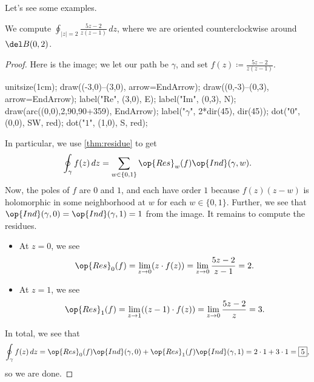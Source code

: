\documentclass[../notes.tex]{subfiles}
\begin{document}
Let's see some examples.
\begin{exe}
	We compute $\oint_{|z|=2}\frac{5z-2}{z(z-1)}\,dz$, where we are oriented counterclockwise around $\del B(0,2)$.
\end{exe}
\begin{proof}
	Here is the image; we let our path be $\gamma$, and set $f(z)\coloneqq \frac{5z-2}{z(z-1)}$.
	\begin{center}
		\begin{asy}
			unitsize(1cm);
			draw((-3,0)--(3,0), arrow=EndArrow);
			draw((0,-3)--(0,3), arrow=EndArrow);
			label("$\textrm{Re}$", (3,0), E);
			label("$\textrm{Im}$", (0,3), N);
			draw(arc((0,0),2,90,90+359), EndArrow);
			label("$\gamma$", 2*dir(45), dir(45));
			dot("$0$", (0,0), SW, red);
			dot("$1$", (1,0), S, red);
		\end{asy}
	\end{center}
	In particular, we use \autoref{thm:residue} to get
	\[\oint_{\gamma}f(z)\,dz=\sum_{w\in\{0,1\}}\op{Res}_w(f)\op{Ind}(\gamma,w).\]
	Now, the poles of $f$ are $0$ and $1$, and each have order $1$ because $f(z)(z-w)$ is holomorphic in some neighborhood at $w$ for each $w\in\{0,1\}$. Further, we see that $\op{Ind}(\gamma,0)=\op{Ind}(\gamma,1)=1$ from the image. It remains to compute the residues.
	\begin{itemize}
		\item At $z=0$, we see
		\[\op{Res}_0(f)=\lim_{z\to0}(z\cdot f(z))=\lim_{z\to0}\frac{5z-2}{z-1}=2.\]
		\item At $z=1$, we see
		\[\op{Res}_1(f)=\lim_{z\to1}((z-1)\cdot f(z))=\lim_{z\to0}\frac{5z-2}z=3.\]
	\end{itemize}
	In total, we see that
	\[\oint_\gamma f(z)\,dz=\op{Res}_0(f)\op{Ind}(\gamma,0)+\op{Res}_1(f)\op{Ind}(\gamma,1)=2\cdot1+3\cdot1=\boxed5,\]
	so we are done.
\end{proof}
\end{document}
